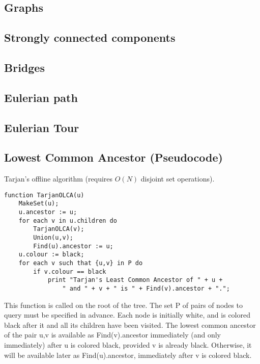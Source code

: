 \documentclass[9pt]{extarticle}
\begin{document}
\begin{multicols*}{3}
\section{Graphs}

\subsection{Strongly connected components} %


\subsection{Bridges} %


\subsection{Eulerian path}


\subsection{Eulerian Tour}


\subsection{Lowest Common Ancestor (Pseudocode)} %
Tarjan's offline algorithm (requires $O(N)$ disjoint set operations).
\begin{lstlisting}
function TarjanOLCA(u)
    MakeSet(u);
    u.ancestor := u;
    for each v in u.children do
        TarjanOLCA(v);
        Union(u,v);
        Find(u).ancestor := u;
    u.colour := black;
    for each v such that {u,v} in P do
        if v.colour == black
            print "Tarjan's Least Common Ancestor of " + u +
                " and " + v + " is " + Find(v).ancestor + ".";
\end{lstlisting}
This function is called on the root of the tree. The set P of pairs of nodes to
query must be specified in advance. Each node is initially white, and is
colored black after it and all its children have been visited. The lowest
common ancestor of the pair {u,v} is available as Find(v).ancestor immediately
(and only immediately) after u is colored black, provided v is already black.
Otherwise, it will be available later as Find(u).ancestor, immediately after v
is colored black.


\end{multicols*}
\end{document}
